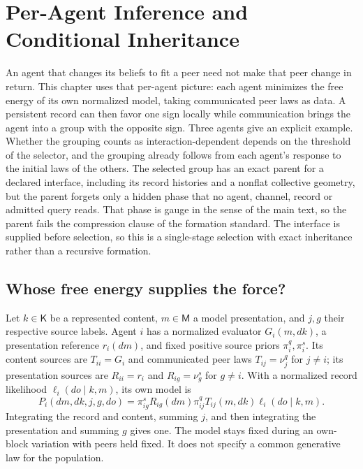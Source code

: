 \chapter{Per-Agent Inference and Conditional Inheritance}
\label{cf:per-agent-inheritance}

An agent that changes its beliefs to fit a peer need not make that peer change in return. This chapter uses that per-agent picture: each agent minimizes the free energy of its own normalized model, taking communicated peer laws as data. A persistent record can then favor one sign locally while communication brings the agent into a group with the opposite sign. Three agents give an explicit example. Whether the grouping counts as interaction-dependent depends on the threshold of the selector, and the grouping already follows from each agent's response to the initial laws of the others. The selected group has an exact parent for a declared interface, including its record histories and a nonflat collective geometry, but the parent forgets only a hidden phase that no agent, channel, record or admitted query reads. That phase is gauge in the sense of the main text, so the parent fails the compression clause of the formation standard. The interface is supplied before selection, so this is a single-stage selection with exact inheritance rather than a recursive formation.

\section{Whose free energy supplies the force?}

Let $k\in\mathsf K$ be a represented content, $m\in\mathsf M$ a model presentation, and $j,g$ their respective source labels. Agent $i$ has a normalized evaluator $G_i(m,dk)$, a presentation reference $r_i(dm)$, and fixed positive source priors $\pi_i^q,\pi_i^s$. Its content sources are $T_{ii}=G_i$ and communicated peer laws $T_{ij}=\nu_j^q$ for $j\ne i$; its presentation sources are $R_{ii}=r_i$ and $R_{ig}=\nu_g^s$ for $g\ne i$. With a normalized record likelihood $\ell_i(do\mid k,m)$, its own model is
\begin{equation}
 P_i(dm,dk,j,g,do)
 =\pi_{ig}^sR_{ig}(dm)\pi_{ij}^qT_{ij}(m,dk)
   \ell_i(do\mid k,m).
 \label{cp:local-model}
\end{equation}
Integrating the record and content, summing $j$, and then integrating the presentation and summing $g$ gives one. The model stays fixed during an own-block variation with peers held fixed. It does not specify a common generative law for the population.

